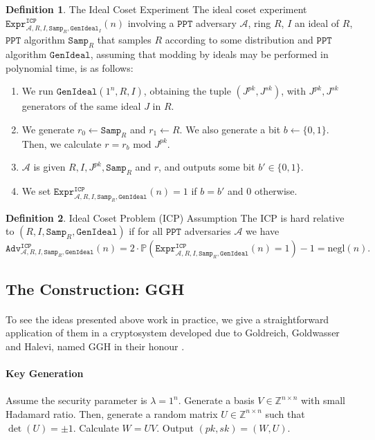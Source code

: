 \documentclass{article}
\theoremstyle{definition}
\newtheorem{definition}{Definition}[section]
\theoremstyle{example}
\newcommand{\A}{\mathcal{A}}
\newcommand{\Prob}{\mathbb{P}}
\newcommand{\Int}{\mathbb{Z}}
\newcommand{\PPT}{\texttt{PPT}}
\newcommand{\negl}{\text{negl}}
\renewcommand{\mod}{\,\,\text{mod}\,\,}
\newcommand{\Expr}[2]{\texttt{Expr}^{\texttt{#1}}_{#2}}
\newcommand{\Adv}[2]{\texttt{Adv}^{\texttt{#1}}_{#2}}
\newcommand{\GenIdeal}{\texttt{GenIdeal}}
\newcommand{\Samp}{\texttt{Samp}}
\begin{document}
\begin{definition}{The Ideal Coset Experiment} The ideal coset experiment
  $\Expr{ICP}{\A, R, I, \Samp_R, \GenIdeal_I}(n)$ involving a $\PPT$ adversary $\A$, ring
  $R$, $I$ an ideal of $R$, $\PPT$ algorithm $\Samp_R$ that samples $R$
  according to some distribution and $\PPT$ algorithm $\GenIdeal$, assuming that modding by ideals may be performed
  in polynomial time, is as follows:
  \begin{enumerate}
  \item We run $\GenIdeal(1^n, R, I)$, obtaining the tuple $(J^{pk}, J^{sk})$,
    with $J^{pk}, J^{sk}$ generators of the same ideal $J$ in $R$.
  \item We generate $r_0 \leftarrow \Samp_R$ and $r_1 \leftarrow R$.
    We also generate a bit $b \leftarrow \{0, 1\}$. Then, we calculate $r = r_b
    \mod J^{pk}$.
  \item $\A$ is given $R, I, J^{pk}, \Samp_R$ and $r$, and outputs some bit $b' \in \{0, 1\}$.
  \item We set $\Expr{ICP}{\A, R, I, \Samp_R, \GenIdeal}(n) = 1$ if $b = b'$ and $0$ otherwise.
  \end{enumerate}
\end{definition}

\begin{definition}{Ideal Coset Problem (ICP) Assumption}
  The ICP is hard relative to $(R,I,\Samp_R,\GenIdeal)$ if for all $\PPT$ adversaries $\A$ we have
  \[
    \Adv{ICP}{\A, R, I, \Samp_R, \GenIdeal}(n) = 2 \cdot \Prob(\Expr{ICP}{\A, R,
      I, \Samp_R, \GenIdeal}(n) = 1) - 1 = \negl(n).
  \]
\end{definition}
\subsection{The Construction: GGH}
\paragraph{} To see the ideas presented above work in practice, we give a
straightforward application of them in a cryptosystem developed due to
Goldreich, Goldwasser and Halevi, named GGH in their honour \cite{goldreich1997public}.
\paragraph{Key Generation}
\paragraph{} Assume the security parameter is $\lambda = 1^n$. Generate a basis
$V \in \Int^{n\times n}$ with small Hadamard ratio. Then, generate a random matrix
$U \in \Int^{n\times n}$ such that $\det(U) = \pm 1$. Calculate $W = UV$. Output
$(pk, sk) = (W, U)$.
\end{document}
